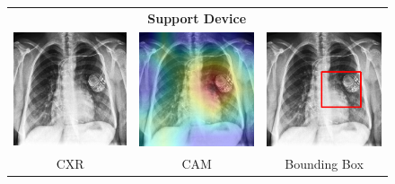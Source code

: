\vspace{10mm}

\begin{figure}[htbp!]
\centering
\begin{tabular}{ccc}
 &\textbf{Support Device}& \\
\vspace{2mm}
  \includegraphics[width=35mm]{Tesi/images/CAMs/CAM2/image.png} &   
  \includegraphics[width=35mm]{Tesi/images/CAMs/CAM2/image_cam.png} &   
  \includegraphics[width=35mm]{Tesi/images/CAMs/CAM2/image_bbox.png} \\
\footnotesize{CXR} & \footnotesize{CAM} & \footnotesize{Bounding Box} \\[6pt]
\end{tabular}
\caption[Support Device CAM-1]{}
\label{fig:figure_5.15}
\end{figure}


